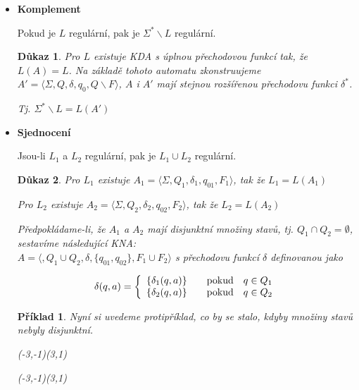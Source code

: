 \documentclass[10pt, a4paper, titlepage]{article}
\theoremstyle{note}
\newtheorem{dukaz}{\textbf{Důkaz}}
\newtheorem{priklad}{\textbf{Příklad}}
\newcommand{\aut}[1]{$A_#1= \langle \Sigma,Q_#1,\delta_#1,q_{0#1},F_#1 \rangle$}
\begin{document}
\begin{itemize}
\item
\textbf{Komplement}

Pokud je $L$ regulární, pak je $\Sigma^* \backslash L$ regulární.
\begin{dukaz}
Pro $L$ existuje KDA s úplnou přechodovou funkcí tak, že $L(A) = L$. Na základě tohoto automatu zkonstruujeme $A'=\langle \Sigma, Q, \delta,q_0,Q \backslash F \rangle$, $A$ i $A'$ mají stejnou rozšířenou přechodovu funkci $\delta^*$.

Tj. $\Sigma^* \backslash L = L(A')$
\end{dukaz}

\item
\textbf{Sjednocení} 

Jsou-li $L_1$ a $L_2$ regulární, pak je $L_1 \cup L_2$ regulární.

\begin{dukaz}
Pro $L_1$ existuje \aut{1}, tak že $L_1=L(A_1)$

Pro $L_2$ existuje \aut{2}, tak že $L_2=L(A_2)$

Předpokládame-li, že $A_1$ a $A_2$ mají disjunktní množiny stavů, tj. $Q_1 \cap Q_2 = \emptyset$, sestavíme následující KNA:\\
$A=\langle,Q_1 \cup Q_2,\delta,\lbrace q_{01},q_{02} \rbrace,F_1 \cup F_2 \rangle$ s přechodovu funkcí $\delta$ definovanou jako

$$
\delta(q,a)=\left\{
\begin{array}{l@{\quad\mbox{}\quad}l}
\lbrace \delta_1(q,a) \rbrace & \text{pokud}\quad q \in Q_1\\
\lbrace \delta_2(q,a) \rbrace & \text{pokud}\quad q \in Q_2\\
\end{array}
\right.
$$
\end{dukaz}
\begin{priklad}
Nyní si uvedeme protipříklad, co by se stalo, kdyby množiny stavů nebyly disjunktní.

\begin{center}
\begin{VCPicture}{(-3,-1)(3,1)}
\end{VCPicture}
\end{center}
\begin{center}
\begin{VCPicture}{(-3,-1)(3,1)}
\end{VCPicture}
\end{center}


\end{priklad}
\end{itemize}
\end{document}
